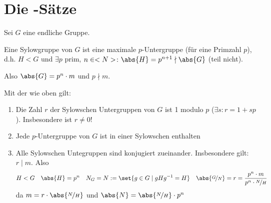 \section{Die -Sätze}
Sei $G$ eine endliche Gruppe.
\begin{definition}
	Eine Sylowgruppe von $G$ ist eine maximale $p$-Untergruppe (für eine Primzahl $p$), d.h. $H < G$ und $\exists p$ prim, $n \in \N\colon \abs{H} = p^{n+1} \nmid \abs{G}$ (teil nicht).
\end{definition}
Also $\abs{G} = p^n \cdot m$ und $p \nmid m$.
\begin{theorem}
	Mit der wie oben gilt:
	\begin{enumerate}
		\item Die Zahl $r$ der Sylowschen Untergruppen von $G$ ist 1 modulo $p$ ($\exists s\colon r = 1+sp$). Insbesondere ist $r \neq 0$!
		\item Jede $p$-Untergruppe von $G$ ist in einer Sylowschen enthalten
		\item Alle Sylowschen Untegruppen sind konjugiert zueinander. Insbesondere gilt: $r \mid m$. Also
		\begin{align*}
			H < G\quad \abs{H} = p^n \quad N_G = N := \set{g\in G \mid gHg^{-1} = H} \quad \abs{\lnkset{G}{N}} = r = \frac{p^n \cdot m}{p^n \cdot \lnkset{N}{H}}
		\end{align*}
		da $m = r \cdot \abs{\lnkset{N}{H}}$ und $\abs{N} = \abs{\lnkset{N}{H}} \cdot p^n$
	\end{enumerate}
\end{theorem}
